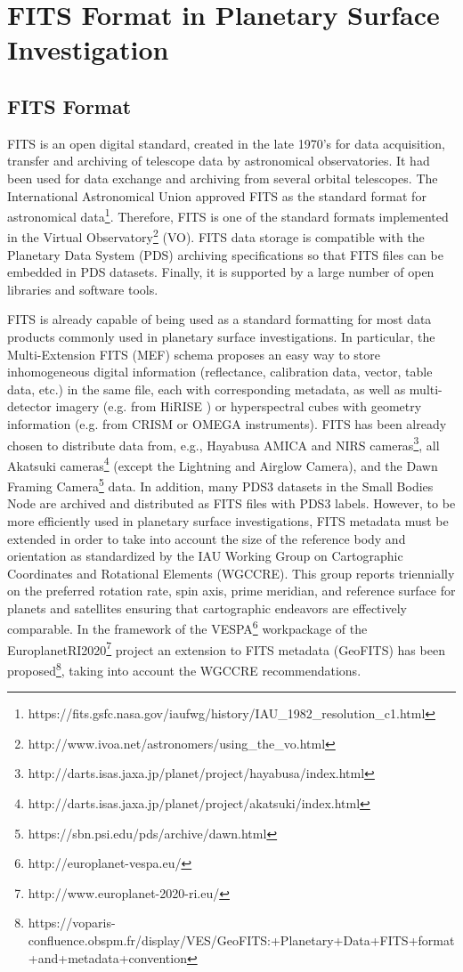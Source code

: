 \section{FITS Format in Planetary Surface Investigation}
\label{sec:fitspss}

\subsection{FITS Format}
FITS is an open digital standard, created in the late 1970's for data acquisition,
transfer and archiving of telescope data by astronomical observatories.
It had been used for data exchange and archiving from several orbital telescopes.
The International Astronomical Union approved FITS as the standard format
for astronomical data\footnote{https://fits.gsfc.nasa.gov/iaufwg/history/IAU\_1982\_resolution\_c1.html}. 
Therefore, FITS is one of the standard formats implemented in the Virtual
Observatory\footnote{http://www.ivoa.net/astronomers/using\_the\_vo.html}
(VO).
FITS data storage is compatible with the Planetary Data System (PDS)
archiving specifications so that FITS files can be embedded in PDS datasets.
Finally, it is supported by a large number of open libraries
and software tools.

FITS is already capable of being used as a standard formatting for most data products
commonly used in planetary surface investigations.
In particular, the Multi-Extension FITS (MEF) schema proposes an easy way
to store inhomogeneous digital information (reflectance, calibration data,
vector, table data, etc.) in the same file, each with corresponding metadata,
as well as multi-detector imagery (e.g. from HiRISE \citep{hirise})
or hyperspectral cubes with geometry information (e.g. from CRISM
\citep{crism} or OMEGA \citep{omega} instruments).
FITS has been already chosen to distribute data from, e.g.,
Hayabusa AMICA and NIRS cameras\footnote{http://darts.isas.jaxa.jp/planet/project/hayabusa/index.html},
all Akatsuki cameras\footnote{http://darts.isas.jaxa.jp/planet/project/akatsuki/index.html}
(except the Lightning and Airglow Camera),
and the Dawn Framing Camera\footnote{https://sbn.psi.edu/pds/archive/dawn.html} data.
In addition, many PDS3 datasets in the Small Bodies Node are archived and distributed
as FITS files with PDS3 labels.
However, to be more efficiently used in planetary surface investigations, FITS metadata
must be extended in order to take into account the size of the reference body and
orientation as standardized by the IAU Working Group on Cartographic Coordinates and
Rotational Elements (WGCCRE).
This group reports triennially \citep{wgccre} on the preferred rotation rate,
spin axis, prime meridian, and reference surface for planets and satellites
ensuring that cartographic endeavors are effectively comparable.
In the framework of the VESPA\footnote{http://europlanet-vespa.eu/}
\citep{vespapss} workpackage of the EuroplanetRI2020\footnote{http://www.europlanet-2020-ri.eu/}
project an extension to FITS metadata (GeoFITS) has been
proposed\footnote{https://voparis-confluence.obspm.fr/display/VES/GeoFITS:+Planetary+Data+FITS+format+and+metadata+convention},
taking into account the WGCCRE recommendations.

